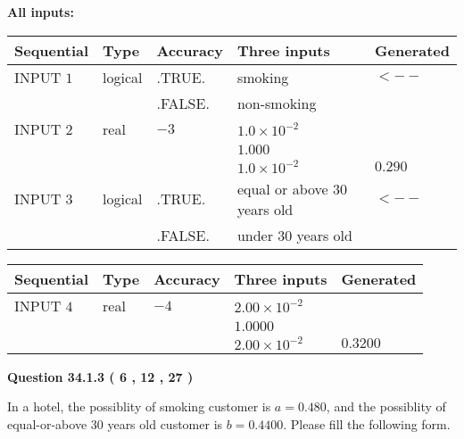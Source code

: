 \documentclass[12pt]{article}
\begin{document}
   
   
   
\noindent\vspace{0.1in}\hspace{-0.08in} {\textbf{\Large{All inputs: }}}
   
   
  
  
\noindent\begin{tabular}{|l|l|l|l|l|}
\hline
 Sequential & Type & Accuracy & Three inputs & Generated \\ 
\hline
 
 
  INPUT $            1 $ & logical & .TRUE. & 
 smoking & 
  $ <-- $ 
  \\
  & & .FALSE. & 
  non-smoking & 
 \\  \hline  
 
 
  INPUT $            2 $ & real & $           -3  $ & $
 1.0 \times 10^{-2}
  $ & \\
  & & &  $
 1.000
  $ & \\
  & & &  $
 1.0 \times 10^{-2}
 $ & $ 0.290 $ 
 \\  \hline  
 
 
  INPUT $            3 $ & logical & .TRUE. & 
 equal or above 30 years old & 
  $ <-- $ 
  \\
  & & .FALSE. & 
  under 30 years old & 
 \\  \hline  
 \end{tabular}
   
   
  
  
\noindent\begin{tabular}{|l|l|l|l|l|}
\hline
 Sequential & Type & Accuracy & Three inputs & Generated \\ 
\hline
 
 
  INPUT $            4 $ & real & $           -4  $ & $
 2.00 \times 10^{-2}
  $ & \\
  & & &  $
 1.0000
  $ & \\
  & & &  $
 2.00 \times 10^{-2}
 $ & $ 0.3200 $ 
 \\  \hline  
 \end{tabular}
   
   
  
\vspace{0.2in}
  
{\textbf{\Large{Question
34.1.3 
 (           6 ,          12 ,          27 )
}}}
  
  
In a hotel, the possiblity of  %
smoking customer is
$a =  %
0.480$, and the possiblity of  %
equal-or-above 30 years old customer is $ b =  %
0.4400$.
Please fill the following form.
 
\end{document}
